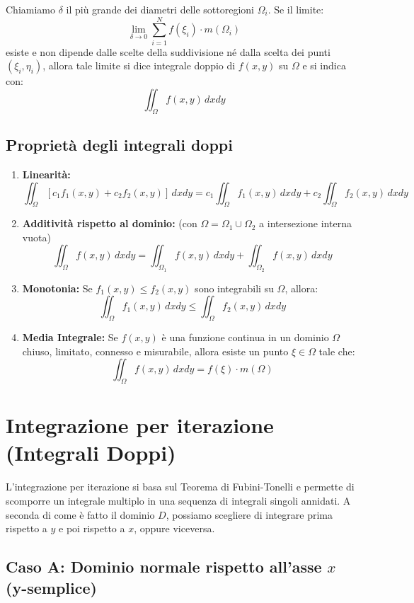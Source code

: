 Chiamiamo $\delta$ il più grande dei diametri delle sottoregioni $\Omega_i$. Se il limite:
\[ \lim_{\delta \to 0} \sum_{i=1}^N f(\xi_i) \cdot m(\Omega_i) \]
esiste e non dipende dalle scelte della suddivisione né dalla scelta dei punti $(\xi_i, \eta_i)$, allora tale limite si dice integrale doppio di $f(x,y)$ su $\Omega$ e si indica con:
\[ \iint_\Omega f(x,y) \, dx dy \]

\subsection{Proprietà degli integrali doppi}
\begin{enumerate}
    \item \textbf{Linearità:} 
    \[ \iint_\Omega [c_1 f_1(x,y) + c_2 f_2(x,y)] \, dx dy = c_1 \iint_\Omega f_1(x,y) \, dx dy + c_2 \iint_\Omega f_2(x,y) \, dx dy \]
    
    \item \textbf{Additività rispetto al dominio:} (con $\Omega = \Omega_1 \cup \Omega_2$ a intersezione interna vuota)
    \[ \iint_{\Omega} f(x,y) \, dx dy = \iint_{\Omega_1} f(x,y) \, dx dy + \iint_{\Omega_2} f(x,y) \, dx dy \]
    
    \item \textbf{Monotonia:} Se $f_1(x,y) \le f_2(x,y)$ sono integrabili su $\Omega$, allora:
    \[ \iint_\Omega f_1(x,y) \, dx dy \le \iint_\Omega f_2(x,y) \, dx dy \]

    \item \textbf{Media Integrale:} Se $f(x,y)$ è una funzione continua in un dominio $\Omega$ chiuso, limitato, connesso e misurabile, allora esiste un punto $\xi \in \Omega$ tale che:
\[ \iint_\Omega f(x,y) \, dx dy = f(\xi) \cdot m(\Omega) \]
\end{enumerate}

\section{Integrazione per iterazione (Integrali Doppi)}

L'integrazione per iterazione si basa sul Teorema di Fubini-Tonelli e permette di scomporre un integrale multiplo in una sequenza di integrali singoli annidati. A seconda di come è fatto il dominio $D$, possiamo scegliere di integrare prima rispetto a $y$ e poi rispetto a $x$, oppure viceversa.

\subsection{Caso A: Dominio normale rispetto all'asse $x$ (y-semplice)}

